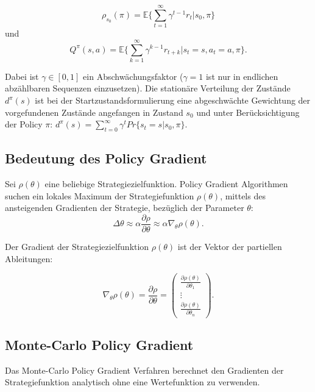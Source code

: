 \documentclass[conference]{IEEEtran}
\begin{document}
\begin{equation*}
\rho_{s_0}(\pi) = \mathbb{E}\{\sum^\infty_{t=1} \gamma^{t-1} r_t | s_0,\pi \}
\end{equation*}
und
\begin{equation*}
Q^\pi (s,a) = \mathbb{E} \{\sum^\infty_{k=1} \gamma^{k-1} r_{t+k} | s_t = s, a_t = a, \pi\}.
\end{equation*}

Dabei ist $\gamma \in [0,1]$ ein Abschwächungsfaktor ($\gamma = 1$ ist nur in endlichen abzählbaren Sequenzen einzusetzen). Die stationäre Verteilung der Zustände $d^\pi (s)$ ist bei der Startzustandsformulierung eine abgeschwächte Gewichtung der vorgefundenen Zustände angefangen in Zustand $s_0$ und unter Berücksichtigung der Policy $\pi$: $d^\pi (s) = \sum^\infty_{t=0} \gamma^t Pr \{s_t = s | s_0, \pi\}$.
 
\subsection{Bedeutung des Policy Gradient}
Sei $\rho(\theta)$ eine beliebige Strategiezielfunktion. Policy Gradient Algorithmen suchen ein lokales Maximum der Strategiefunktion $\rho(\theta)$, mittels des ansteigenden Gradienten der Strategie, bezüglich der Parameter $\theta$:   
\begin{equation*}
\Delta \theta \approx \alpha \frac{\partial \rho}{\partial \theta} \approx \alpha \nabla_\theta \rho(\theta).
\end{equation*}

Der Gradient der Strategiezielfunktion $\rho(\theta)$ ist der Vektor der partiellen Ableitungen:

\begin{equation*}
\nabla_\theta \rho(\theta) = \frac{\partial \rho}{\partial \theta} =
\begin{pmatrix}
\frac{\partial \rho(\theta)}{\partial \theta_1} \\ 
\vdots \\
\frac{\partial \rho(\theta)}{\partial \theta_n}
\end{pmatrix}.
\end{equation*}

\subsection{Monte-Carlo Policy Gradient}
Das Monte-Carlo Policy Gradient Verfahren berechnet den Gradienten der Strategiefunktion analytisch ohne eine Wertefunktion zu verwenden.
\end{document}
